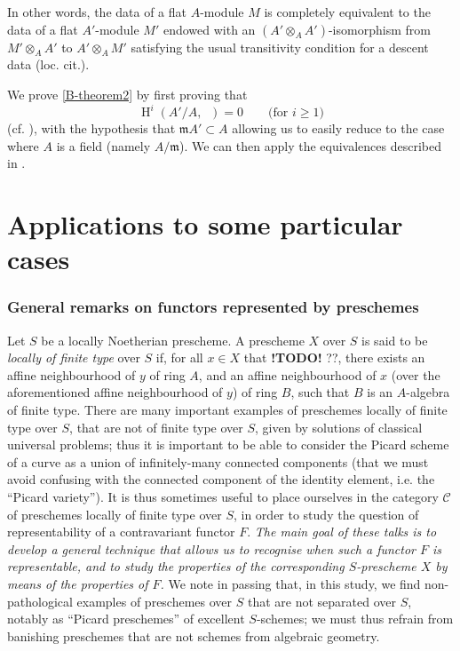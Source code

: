 \documentclass{article}
\theoremstyle{plain}
\theoremstyle{definition}
\newcommand{\cat}[1]{{\mathcal{#1}}}
\newcommand{\fk}[1]{{\mathfrak{#1}}}
\renewcommand{\geq}{\geqslant}
\DeclareMathOperator{\HH}{H}
\DeclareMathOperator{\Ga}{G_a}
\newcommand{\todo}{\textbf{ !TODO! }}
\newcommand{\oldpage}[1]{\marginpar{\footnotesize$\Big\vert$ \textit{p.~#1}}}
\begin{document}
In other words, the data of a flat $A$-module $M$ is completely equivalent to the data of a flat $A'$-module $M'$ endowed with an $(A'\otimes_A A')$-isomorphism from $M'\otimes_A A'$ to $A'\otimes_A M'$ satisfying the usual transitivity condition for a descent data (loc. cit.).

We prove \cref{B-theorem2} by first proving that
\[
  \HH^i(A'/A,\Ga) = 0
  \qquad\mbox{(for $i\geq1$)}
\]
(cf. \cite[A, \S4.e]{3}), with the hypothesis that $\fk{m}A'\subset A$ allowing us to easily reduce to the case where $A$ is a field (namely $A/\fk{m}$).
We can then apply the equivalences described in \cite[p.~16]{3}.


\part{Applications to some particular cases}
\label{C}


\section{General remarks on functors represented by preschemes}
\label{C.1}

Let $S$ be a locally Noetherian prescheme.
A prescheme $X$ over $S$ is said to be
\oldpage{195-11}
\emph{locally of finite type} over $S$ if, for all $x\in X$ that \todo{??}, there exists an affine neighbourhood of $y$ of ring $A$, and an affine neighbourhood of $x$ (over the aforementioned affine neighbourhood of $y$) of ring $B$, such that $B$ is an $A$-algebra of finite type.
There are many important examples of preschemes locally of finite type over $S$, that are not of finite type over $S$, given by solutions of classical universal problems;
thus it is important to be able to consider the Picard scheme of a curve as a union of infinitely-many connected components (that we must avoid confusing with the connected component of the identity element, i.e. the ``Picard variety'').
It is thus sometimes useful to place ourselves in the category $\cat{C}$ of preschemes locally of finite type over $S$, in order to study the question of representability of a contravariant functor $F$.
\emph{The main goal of these talks is to develop a general technique that allows us to recognise when such a functor $F$ is representable, and to study the properties of the corresponding $S$-prescheme $X$ by means of the properties of $F$.}
We note in passing that, in this study, we find non-pathological examples of preschemes over $S$ that are not separated over $S$, notably as ``Picard preschemes'' of excellent $S$-schemes;
we must thus refrain from banishing preschemes that are not schemes from algebraic geometry.
\end{document}
